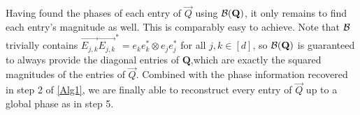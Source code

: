 Having found the phases of each entry of $\vec{Q}$ using $\mathcal{B} ( \mathbf{Q} )$, it only remains to find each entry's magnitude as well.  This is comparably easy to achieve.  Note that $\mathcal{B}$ trivially contains $\vec{E_{j,k}}\vec{E_{j,k}}^* = e_ke_k^* \otimes e_je_j^*$ for all $j, k \in [d]$, so $\mathcal{B} ( \mathbf{Q} )$ is guaranteed to always provide the diagonal entries of $\mathbf{Q}$,which are exactly the squared magnitudes of the entries of $\vec{Q}$.  Combined with the phase information recovered in step 2 of \ref{Alg1}, we are finally able to reconstruct every entry of $\vec{Q}$ up to a global phase as in step 5.
